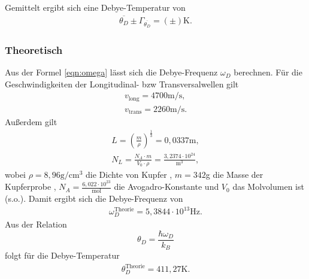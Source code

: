Gemittelt ergibt sich eine Debye-Temperatur von
\begin{align*}
  \overline{\theta_D} \pm \Gamma_{\overline{\theta_D}} = (\pm)\text{K}.
  \end{align*}

\subsubsection{Theoretisch}
Aus der Formel \eqref{eqn:omega} lässt sich die Debye-Frequenz $\omega_D$ berechnen.
Für die Geschwindigkeiten der Longitudinal- bzw Transversalwellen gilt \cite{skript}
\begin{align*}
  v_{\text{long}} = 4700\text{m{/s}}, \\
  v_{\text{trans}} = 2260\text{m/s}.
\end{align*}
Außerdem gilt
\begin{gather*}
  L = \left({\frac{m}{\rho}}\right)^{\frac{1}{3}} = 0,0337\text{m}, \\
  N_L = \frac{N_A \cdot m}{V_0 \cdot \rho} = \frac{3,2374\cdot10^{24}}{\text{m}^3},
\end{gather*}
wobei $\rho = 8,96 \text{g}/\text{cm}^3$ die Dichte von Kupfer \cite{cu}, $m = 342$g die Masse der Kupferprobe \cite{skript},
$N_A = \frac{6,022\cdot10^{23}}{\text{mol}}$ die Avogadro-Konstante \cite{dem} und $V_0$ das Molvolumen ist (s.o.).
Damit ergibt sich die Debye-Frequenz von
\begin{align*}
  \omega_D^{\text{Theorie}} = 5,3844\cdot10^{13}\text{Hz}.
\end{align*}
Aus der Relation
\begin{equation}
  \theta_D = \frac{\hbar\omega_D}{k_B}
\end{equation}
folgt für die Debye-Temperatur
\begin{align*}
  \theta_D^{\text{Theorie}} = 411,27\text{K}.
\end{align*}
